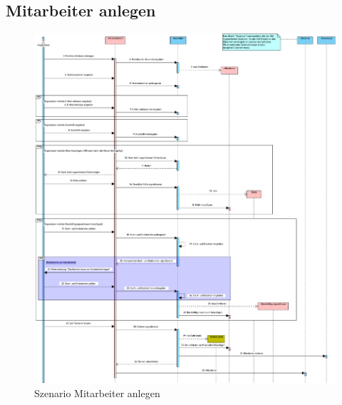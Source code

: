 \FloatBarrier

\subsection{Mitarbeiter anlegen}

\begin{figure}[ht!]
    \centering
    \includegraphics[width=0.98\columnwidth]{Bilder/seq_Mitarbeiter_anlegen.pdf}
    \caption{Szenario Mitarbeiter anlegen}
    \label{seq:mitarbeiter-anlegen}
\end{figure}

